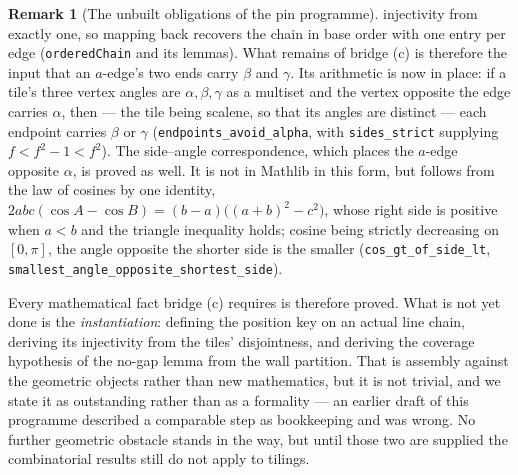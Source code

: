 \documentclass[11pt,reqno]{amsart}
\theoremstyle{plain}
\theoremstyle{definition}
\newtheorem{remark}[theorem]{Remark}
\begin{document}
\begin{remark}[The unbuilt obligations of the pin programme]
injectivity from exactly one, so mapping back recovers the chain in base order with one entry per
edge (\texttt{orderedChain} and its lemmas). What remains of bridge (c) is therefore the input
that an
$a$-edge's two ends carry $\beta$ and $\gamma$. Its arithmetic is now in place: if a tile's three
vertex angles are $\alpha,\beta,\gamma$ as a multiset and the vertex opposite the edge carries
$\alpha$, then --- the tile being scalene, so that its angles are distinct --- each endpoint
carries $\beta$ or $\gamma$ (\texttt{endpoints\_avoid\_alpha}, with
\texttt{sides\_strict} supplying $f<f^2-1<f^2$). The side--angle correspondence, which places the $a$-edge opposite $\alpha$, is proved as well.
It is not in Mathlib in this form, but follows from the law of cosines by one identity,
$2abc(\cos A-\cos B)=(b-a)\bigl((a+b)^2-c^2\bigr)$, whose right side is positive when $a<b$ and
the triangle inequality holds; cosine being strictly decreasing on $[0,\pi]$, the angle opposite
the shorter side is the smaller (\texttt{cos\_gt\_of\_side\_lt},
\texttt{smallest\_angle\_opposite\_shortest\_side}).

Every mathematical fact bridge (c) requires is therefore proved. What is not yet done is the
\emph{instantiation}: defining the position key on an actual line chain, deriving its injectivity
from the tiles' disjointness, and deriving the coverage hypothesis of the no-gap lemma from the
wall partition. That is assembly against the geometric objects rather than new mathematics, but it
is not trivial, and we state it as outstanding rather than as a formality --- an earlier draft of
this programme described a comparable step as bookkeeping and was wrong. No further geometric obstacle stands in the way, but until those two are supplied the
combinatorial results still do not apply to tilings.
\end{remark}
\end{document}
